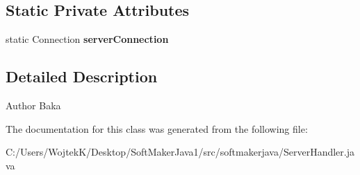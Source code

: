 \subsection*{Static Private Attributes}
\begin{DoxyCompactItemize}
\item 
static Connection {\bfseries server\+Connection}\hypertarget{classsoftmakerjava_1_1_server_handler_aac99fbd5c63a9d9a9225c9f356e55830}{}\label{classsoftmakerjava_1_1_server_handler_aac99fbd5c63a9d9a9225c9f356e55830}

\end{DoxyCompactItemize}


\subsection{Detailed Description}
\begin{DoxyAuthor}{Author}
Baka 
\end{DoxyAuthor}


The documentation for this class was generated from the following file\+:\begin{DoxyCompactItemize}
\item 
C\+:/\+Users/\+Wojtek\+K/\+Desktop/\+Soft\+Maker\+Java1/src/softmakerjava/Server\+Handler.\+java\end{DoxyCompactItemize}
